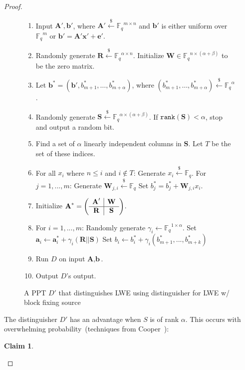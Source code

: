 \documentclass[11pt]{article}
\newcommand{\vect}[1]{\ensuremath{\textbf{#1}}}
\newcommand{\Fq}{\ensuremath{\mathbb{F}_q}}
\newcommand{\rank}{\ensuremath{\mathtt{rank}}\xspace}
\newtheorem{claim}[theorem]{Claim}
\newcommand{\ve}{\vect{e}}
\newcommand{\vS}{\vect{S}}
\newcommand{\vA}{\vect{A}}
\newcommand{\vW}{\vect{W}}
\newcommand{\vR}{\vect{R}}
\newcommand{\vx}{\vect{x}}
\newcommand{\va}{\vect{a}}
\newcommand{\vb}{\vect{b}}
\begin{document}
\begin{proof}
\begin{figure}[p]
\begin{framed}
\begin{enumerate}
\item Input $\vA', \vb'$, where $\vA' \overset{\$} \leftarrow \Fq^{m\times n}$ and $\vb'$ is either uniform over $\Fq^m$ or $\vb' = \vA'\vx' +\ve'$.
\item Randomly generate $\vect{R} \overset{\$}\leftarrow \Fq^{\alpha \times n}$. Initialize $\vW \in \Fq^{n\times (\alpha+\beta)}$ to be the zero matrix.
\item Let $\vb^* = (\vb', b^*_{m+1}, \ldots,b^*_{m+\alpha})$, where $(b^*_{m+1}, \ldots, b^*_{m+\alpha} )\overset{\$} \leftarrow \Fq^\alpha$.\label{step:b generation}
\item Randomly generate $\vect{S} \overset{\$}\leftarrow \Fq^{\alpha \times (\alpha+\beta)}$.
		\subitem If $\rank(\vect{S})<\alpha$, stop and output a random bit.
\item Find a set of $\alpha$ linearly independent columns in $\vS$.  Let $T$ be the set of these indices.
\item For all $x_i$ where $n\leq i$ and $i\not \in T$:\label{step:fill in matrix}
\subitem Generate $x_i\overset{\$}\leftarrow \Fq$.  
\subitem For $j=1,..., m$:
\subsubitem Generate $\vW_{j, i}\overset{\$}\leftarrow \Fq$
\subsubitem Set $b_j^* = b_j^* + \vW_{j, i} x_i$.
\item Initialize $\vA^*  = \left(\begin{array}{c | c}\vA' & \vW\\\hline \vR & \vS\end{array}\right)$.
\item \label{step:randomization}
For {$i=1,..., m$}:
\subitem Randomly generate $\gamma_i \leftarrow \Fq^{1 \times \alpha}$.
\subitem Set $\va_{i} \leftarrow \va^*_{i}+\gamma_i (\vR||\vS)$
\subitem Set $b_i \leftarrow b^*_i + \gamma_i (b^*_{m+1},..., b^*_{m+k})$
\item Run $D$ on input $\vA, \vb$.
\item Output $D$'s output.
\end{enumerate}
\end{framed}
\caption{A PPT $D'$ that distinguishes LWE using distinguisher for LWE w/ block fixing source}
\label{fig:perfectLWEreduction}
\end{figure}
The distinguisher $D'$ has an advantage when $S$ is of rank $\alpha$.  This occurs with overwhelming probability~(techniques from Cooper~\cite{cooper2000rank}):
\begin{claim}

\end{claim}
\end{proof}
\end{document}
